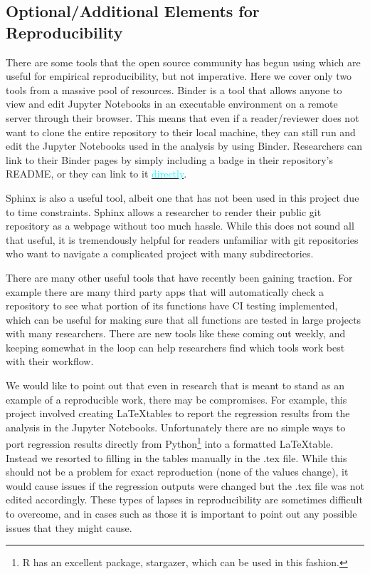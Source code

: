 \documentclass[12pt]{article}
\begin{document}
\subsection{Optional/Additional Elements for Reproducibility}
There are some tools that the open source community has begun using which are useful for empirical reproducibility, but not imperative. Here we cover only two tools from a massive pool of resources. Binder is a tool that allows anyone to view and edit Jupyter Notebooks in an executable environment on a remote server through their browser. This means that even if a reader/reviewer does not want to clone the entire repository to their local machine, they can still run and edit the Jupyter Notebooks used in the analysis by using Binder. Researchers can link to their Binder pages by simply including a badge in their repository's README, or they can link to it \href{https://mybinder.org/v2/gh/nadavtadelis/Reproducible_Metrics/master}{\textcolor{cyan}{directly}}. 

Sphinx is also a useful tool, albeit one that has not been used in this project due to time constraints. Sphinx allows a researcher to render their public git repository as a webpage without too much hassle. While this does not sound all that useful, it is tremendously helpful for readers unfamiliar with git repositories who want to navigate a complicated project with many subdirectories. 

There are many other useful tools that have recently been gaining traction. For example there are many third party apps that will automatically check a repository to see what portion of its functions have CI testing implemented, which can be useful for making sure that all functions are tested in large projects with many researchers. There are new tools like these coming out weekly, and keeping somewhat in the loop can help researchers find which tools work best with their workflow.

We would like to point out that even in research that is meant to stand as an example of a reproducible work, there may be compromises. For example, this project involved creating \LaTeX tables to report the regression results from the analysis in the Jupyter Notebooks. Unfortunately there are no simple ways to port regression results directly from Python\footnote{R has an excellent package, stargazer, which can be used in this fashion.} into a formatted \LaTeX table. Instead we resorted to filling in the tables manually in the .tex file. While this should not be a problem for exact reproduction (none of the values change), it would cause issues if the regression outputs were changed but the .tex file was not edited accordingly. These types of lapses in reproducibility are sometimes difficult to overcome, and in cases such as those it is important to point out any possible issues that they might cause.
\end{document}
